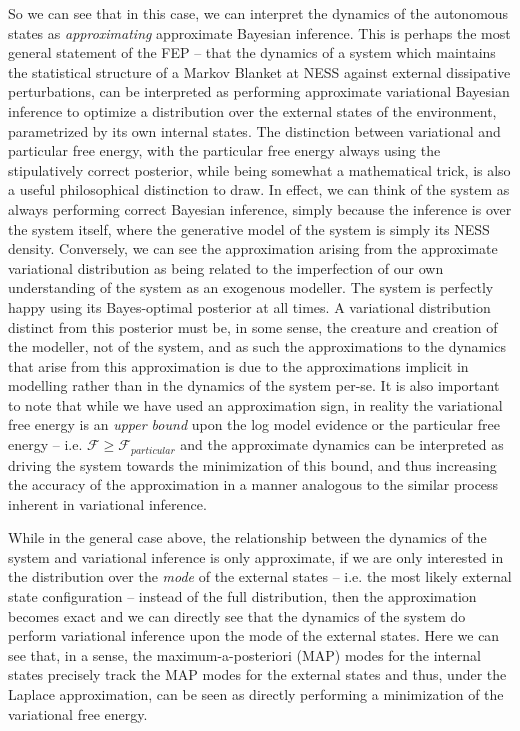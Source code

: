 So we can see that in this case, we can interpret the dynamics of the autonomous states as \emph{approximating} approximate Bayesian inference. This is perhaps the most general statement of the FEP -- that the dynamics of a system which maintains the statistical structure of a Markov Blanket at NESS against external dissipative perturbations, can be interpreted as performing approximate variational Bayesian inference to optimize a distribution over the external states of the environment, parametrized by its own internal states. The distinction between variational and particular free energy, with the particular free energy always using the stipulatively correct posterior, while being somewhat a mathematical trick, is also a useful philosophical distinction to draw. In effect, we can think of the system as always performing correct Bayesian inference, simply because the inference is over the system itself, where the generative model of the system is simply its NESS density. Conversely, we can see the approximation arising from the approximate variational distribution as being related to the imperfection of our own understanding of the system as an exogenous modeller. The system is perfectly happy using its Bayes-optimal posterior at all times. A variational distribution distinct from this posterior must be, in some sense, the creature and creation of the modeller, not of the system, and as such the approximations to the dynamics that arise from this approximation is due to the approximations implicit in modelling rather than in the dynamics of the system per-se. It is also important to note that while we have used an approximation sign, in reality the variational free energy is an \emph{upper bound} upon the log model evidence or the particular free energy -- i.e. $\mathcal{F} \geq \mathcal{F}_{particular}$ and the approximate dynamics can be interpreted as driving the system towards the minimization of this bound, and thus increasing the accuracy of the approximation in a manner analogous to the similar process inherent in variational inference.

While in the general case above, the relationship between the dynamics of the system and variational inference is only approximate, if we are only interested in the distribution over the \emph{mode} of the external states -- i.e. the most likely external state configuration -- instead of the full distribution, then the approximation becomes exact and we can directly see that the dynamics of the system do perform variational inference upon the mode of the external states. Here we can see that, in a sense, the maximum-a-posteriori (MAP) modes for the internal states precisely track the MAP modes for the external states and thus, under the Laplace approximation, can be seen as directly performing a minimization of the variational free energy.

